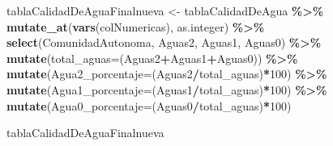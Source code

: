 \documentclass[
]{article}
\newenvironment{Shaded}{\begin{snugshade}}{\end{snugshade}}
\newcommand{\AttributeTok}[1]{\textcolor[rgb]{0.13,0.29,0.53}{#1}}
\newcommand{\DecValTok}[1]{\textcolor[rgb]{0.00,0.00,0.81}{#1}}
\newcommand{\FunctionTok}[1]{\textcolor[rgb]{0.13,0.29,0.53}{\textbf{#1}}}
\newcommand{\NormalTok}[1]{#1}
\newcommand{\OtherTok}[1]{\textcolor[rgb]{0.56,0.35,0.01}{#1}}
\newcommand{\SpecialCharTok}[1]{\textcolor[rgb]{0.81,0.36,0.00}{\textbf{#1}}}
\begin{document}
\begin{Shaded}
\begin{Highlighting}[]
\NormalTok{tablaCalidadDeAguaFinalnueva }\OtherTok{\textless{}{-}}\NormalTok{ tablaCalidadDeAgua }\SpecialCharTok{\%\textgreater{}\%}
  \FunctionTok{mutate\_at}\NormalTok{(}\FunctionTok{vars}\NormalTok{(colNumericas), as.integer) }\SpecialCharTok{\%\textgreater{}\%}
  \FunctionTok{select}\NormalTok{(ComunidadAutonoma, Aguas2, Aguas1, Aguas0) }\SpecialCharTok{\%\textgreater{}\%}  
  \FunctionTok{mutate}\NormalTok{(}\AttributeTok{total\_aguas=}\NormalTok{(Aguas2}\SpecialCharTok{+}\NormalTok{Aguas1}\SpecialCharTok{+}\NormalTok{Aguas0)) }\SpecialCharTok{\%\textgreater{}\%} 
  \FunctionTok{mutate}\NormalTok{(}\AttributeTok{Agua2\_porcentaje=}\NormalTok{(Aguas2}\SpecialCharTok{/}\NormalTok{total\_aguas)}\SpecialCharTok{*}\DecValTok{100}\NormalTok{) }\SpecialCharTok{\%\textgreater{}\%} 
  \FunctionTok{mutate}\NormalTok{(}\AttributeTok{Agua1\_porcentaje=}\NormalTok{(Aguas1}\SpecialCharTok{/}\NormalTok{total\_aguas)}\SpecialCharTok{*}\DecValTok{100}\NormalTok{) }\SpecialCharTok{\%\textgreater{}\%} 
  \FunctionTok{mutate}\NormalTok{(}\AttributeTok{Agua0\_porcentaje=}\NormalTok{(Aguas0}\SpecialCharTok{/}\NormalTok{total\_aguas)}\SpecialCharTok{*}\DecValTok{100}\NormalTok{)  }

\NormalTok{tablaCalidadDeAguaFinalnueva}
\end{Highlighting}
\end{Shaded}
\end{document}
